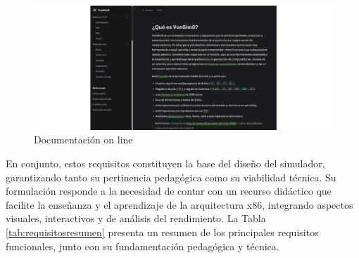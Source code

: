 \documentclass[12pt,oneside]{templates/unerthesis}
\begin{document}
\begin{figure}

{\centering \includegraphics[width=0.9\linewidth]{images/documentacion} 

}

\caption{Documentación on line}\label{fig:documentacion}
\end{figure}

En conjunto, estos requisitos constituyen la base del diseño del simulador, garantizando tanto su pertinencia pedagógica como su viabilidad técnica. Su formulación responde a la necesidad de contar con un recurso didáctico que facilite la enseñanza y el aprendizaje de la arquitectura x86, integrando aspectos visuales, interactivos y de análisis del rendimiento. La Tabla \ref{tab:requisitosresumen} presenta un resumen de los principales requisitos funcionales, junto con su fundamentación pedagógica y técnica.
\end{document}
